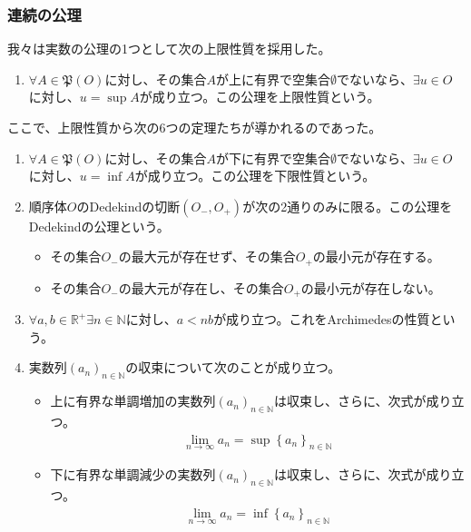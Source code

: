 \documentclass[dvipdfmx]{jsarticle}
\begin{document}
\subsubsection{連続の公理}%
\begin{axs}[連続の公理]
我々は実数の公理の1つとして次の上限性質を採用した。
\begin{enumerate}
\item
  $\forall A \in \mathfrak{P}(O)$に対し、その集合$A$が上に有界で空集合$\emptyset$でないなら、$\exists u \in O$に対し、$u = \sup A$が成り立つ。この公理を上限性質という。
\end{enumerate}
ここで、上限性質から次の6つの定理たちが導かれるのであった。
\begin{enumerate}
\def\labelenumi{\arabic{enumi}.}
\setcounter{enumi}{1}
\item
  $\forall A \in \mathfrak{P}(O)$に対し、その集合$A$が下に有界で空集合$\emptyset$でないなら、$\exists u \in O$に対し、$u = \inf A$が成り立つ。この公理を下限性質という。
\item
  順序体$O$のDedekindの切断$\left( O_{-},O_{+} \right)$が次の2通りのみに限る。この公理をDedekindの公理という。
  \begin{itemize}
  \item
    その集合$O_{-}$の最大元が存在せず、その集合$O_{+}$の最小元が存在する。
  \item
    その集合$O_{-}$の最大元が存在し、その集合$O_{+}$の最小元が存在しない。
  \end{itemize}
\item
  $\forall a,b \in \mathbb{R}^{+}\exists n \in \mathbb{N}$に対し、$a < nb$が成り立つ。これをArchimedesの性質という。
\item
  実数列$\left( a_{n} \right)_{n \in \mathbb{N}}$の収束について次のことが成り立つ。
  \begin{itemize}
  \item
    上に有界な単調増加の実数列$\left( a_{n} \right)_{n \in \mathbb{N}}$は収束し、さらに、次式が成り立つ。
\begin{align*}
\lim_{n \rightarrow \infty}a_{n} = \sup\left\{ a_{n} \right\}_{n \in \mathbb{N}}
\end{align*}
  \item
    下に有界な単調減少の実数列$\left( a_{n} \right)_{n \in \mathbb{N}}$は収束し、さらに、次式が成り立つ。
\begin{align*}
\lim_{n \rightarrow \infty}a_{n} = \inf\left\{ a_{n} \right\}_{n \in \mathbb{N}}

\end{align*}
\end{itemize}
\end{enumerate}
\end{axs}
\end{document}
